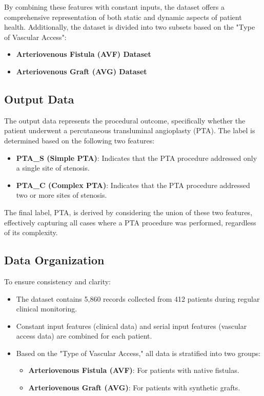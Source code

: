 By combining these features with constant inputs, the dataset offers a comprehensive representation of both static and dynamic aspects of patient health. Additionally, the dataset is divided into two subsets based on the "Type of Vascular Access":

\begin{itemize}
    \item \textbf{Arteriovenous Fistula (AVF) Dataset}
    \item \textbf{Arteriovenous Graft (AVG) Dataset}
\end{itemize}

\subsection{Output Data}
The output data represents the procedural outcome, specifically whether the patient underwent a percutaneous transluminal angioplasty (PTA). The label is determined based on the following two features:

\begin{itemize}
    \item \textbf{PTA\_S (Simple PTA)}: Indicates that the PTA procedure addressed only a single site of stenosis.
    \item \textbf{PTA\_C (Complex PTA)}: Indicates that the PTA procedure addressed two or more sites of stenosis.
\end{itemize}

The final label, PTA, is derived by considering the union of these two features, effectively capturing all cases where a PTA procedure was performed, regardless of its complexity.

\subsection{Data Organization}
To ensure consistency and clarity:

\begin{itemize}
    \item The dataset contains 5,860 records collected from 412 patients during regular clinical monitoring.
    \item Constant input features (clinical data) and serial input features (vascular access data) are combined for each patient.
    \item Based on the "Type of Vascular Access," all data is stratified into two groups:
    \begin{itemize}
        \item \textbf{Arteriovenous Fistula (AVF)}: For patients with native fistulas.
        \item \textbf{Arteriovenous Graft (AVG)}: For patients with synthetic grafts.
    \end{itemize}
\end{itemize}

